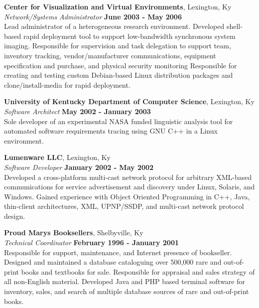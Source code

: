 \documentclass[margin,line]{resume}
\begin{document}
\begin{resume}
    \textbf{Center for Visualization and Virtual Environments}, Lexington, Ky  \\
    \textsl{Network/Systems Administrator} \hfill \textbf{June 2003 - May 2006}\vspace{2mm}\\%
    Lead administrator of a heterogeneous research environment.  Developed shell-based rapid 
    deployment tool to support low-bandwidth synchronous system imaging. Responsible for 
    supervision and task delegation to support team, inventory tracking, vendor/manufacturer
    communications, equipment specification and purchase, and physical security monitoring
    Responsible for creating and testing custom Debian-based Linux distribution packages and 
    clone/install-media for rapid deployment. 

    \textbf{University of Kentucky Department of Computer Science}, Lexington, Ky \\
    \textsl{Software Architect} \hfill \textbf{May 2002 - January 2003}\vspace{2mm}\\%
    Sole developer of an experimental NASA funded linguistic analysis tool for automated 
    software requirements tracing using GNU C++ in a Linux environment.
  
    \textbf{Lumenware LLC}, Lexington, Ky \\
    \textsl{Software Developer} \hfill \textbf{January 2002 - May 2002}\vspace{2mm}\\%
    Developed a cross-platform multi-cast network protocol for arbitrary XML-based communications 
    for service advertisement and discovery under Linux,  Solaris, and Windows. Gained experience 
    with Object Oriented Programming in C++, Java, thin-client architectures, XML, UPNP/SSDP, and 
    multi-cast network protocol design.\newpage

    \textbf{Proud Marys Booksellers}, Shelbyville, Ky \\
    \textsl{Technical Coordinator} \hfill \textbf{February 1996 - January 2001}\vspace{2mm}\\%
    Responsible for support, maintenance, and Internet presence of  bookseller. Designed and 
    maintained a database cataloguing over 500,000 rare and out-of-print books and textbooks for 
    sale.  Responsible for appraisal and sales strategy of all non-English material. Developed Java 
    and PHP based terminal software for inventory, sales, and search of multiple database sources 
    of rare and out-of-print books.


\end{resume}
\end{document}
